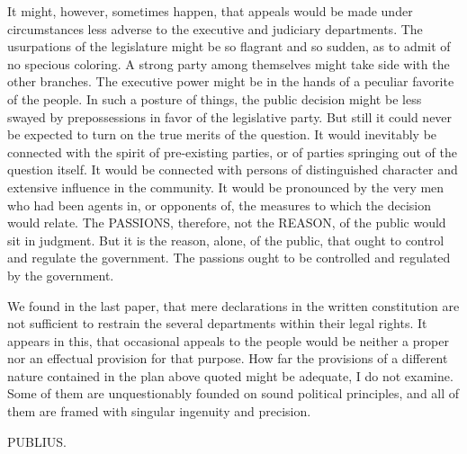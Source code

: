It might, however, sometimes happen, that appeals would be made under circumstances less adverse to the executive and judiciary departments. The usurpations of the legislature might be so flagrant and so sudden, as to admit of no specious coloring. A strong party among themselves might take side with the other branches. The executive power might be in the hands of a peculiar favorite of the people. In such a posture of things, the public decision might be less swayed by prepossessions in favor of the legislative party. But still it could never be expected to turn on the true merits of the question. It would inevitably be connected with the spirit of pre-existing parties, or of parties springing out of the question itself. It would be connected with persons of distinguished character and extensive influence in the community. It would be pronounced by the very men who had been agents in, or opponents of, the measures to which the decision would relate. The PASSIONS, therefore, not the REASON, of the public would sit in judgment. But it is the reason, alone, of the public, that ought to control and regulate the government. The passions ought to be controlled and regulated by the government.

We found in the last paper, that mere declarations in the written constitution are not sufficient to restrain the several departments within their legal rights. It appears in this, that occasional appeals to the people would be neither a proper nor an effectual provision for that purpose. How far the provisions of a different nature contained in the plan above quoted might be adequate, I do not examine. Some of them are unquestionably founded on sound political principles, and all of them are framed with singular ingenuity and precision.

PUBLIUS.